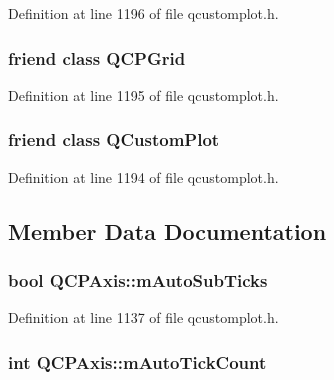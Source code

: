 Definition at line 1196 of file qcustomplot.\-h.

\hypertarget{class_q_c_p_axis_a061e177f585549fc31f780852e2bd6fe}{
\subsubsection[{Q\-C\-P\-Grid}]{\setlength{\rightskip}{0pt plus 5cm}friend class {\bf Q\-C\-P\-Grid}\hspace{0.3cm}{\ttfamily [friend]}}}\label{class_q_c_p_axis_a061e177f585549fc31f780852e2bd6fe}


Definition at line 1195 of file qcustomplot.\-h.

\hypertarget{class_q_c_p_axis_a1cdf9df76adcfae45261690aa0ca2198}{
\subsubsection[{Q\-Custom\-Plot}]{\setlength{\rightskip}{0pt plus 5cm}friend class {\bf Q\-Custom\-Plot}\hspace{0.3cm}{\ttfamily [friend]}}}\label{class_q_c_p_axis_a1cdf9df76adcfae45261690aa0ca2198}


Definition at line 1194 of file qcustomplot.\-h.



\subsection{Member Data Documentation}
\hypertarget{class_q_c_p_axis_aaae980b0d193d959674e314dbb6c2c3b}{
\subsubsection[{m\-Auto\-Sub\-Ticks}]{\setlength{\rightskip}{0pt plus 5cm}bool Q\-C\-P\-Axis\-::m\-Auto\-Sub\-Ticks\hspace{0.3cm}{\ttfamily [protected]}}}\label{class_q_c_p_axis_aaae980b0d193d959674e314dbb6c2c3b}


Definition at line 1137 of file qcustomplot.\-h.

\hypertarget{class_q_c_p_axis_a499fbb67111e4b204738f6c1aa28d842}{
\subsubsection[{m\-Auto\-Tick\-Count}]{\setlength{\rightskip}{0pt plus 5cm}int Q\-C\-P\-Axis\-::m\-Auto\-Tick\-Count\hspace{0.3cm}{\ttfamily [protected]}}}\label{class_q_c_p_axis_a499fbb67111e4b204738f6c1aa28d842}


